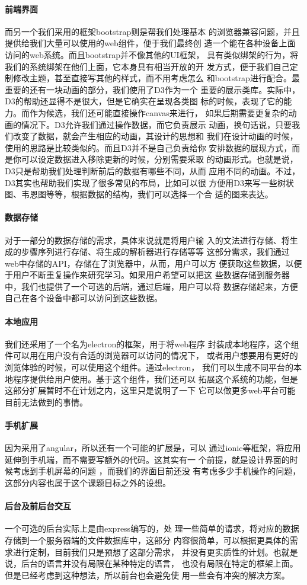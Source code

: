 \paragraph{前端界面} 而另一个我们采用的框架bootstrap则是帮我们处理基本
的浏览器兼容问题，并且提供给我们大量可以使用的web组件，便于我们最终创
造一个能在各种设备上面访问的web系统。而且bootstrap并不像其他的UI框架，
具有类似绑架的行为，将我们的系统绑架在他们上面，它本身具有相当开放的开
发方式，便于我们自己定制修改主题，甚至直接写其他的样式，而不用考虑怎么
和bootstrap进行配合。最重要的还有一块动画的部分，我们使用了D3作为一个
重要的展示类库。实际中，D3的帮助还显得不是很大，但是它确实在呈现各类图
标的时候，表现了它的能力。而作为候选，我们还可能直接操作canvas来进行，
如果后期需要更复杂的动画的情况下。D3允许我们通过操作数据，而它负责展示
动画，换句话说，只要我们改变了数据，就会产生相应的动画，其设计的思想和
我们在设计动画的时候，使用的思路是比较类似的。而且D3并不是自己负责给你
安排数据的展现方式，而是你可以设定数据进入移除更新的时候，分别需要采取
的动画形式。也就是说，D3只是帮助我们处理判断前后的数据有哪些不同，从而
应用不同的动画。不过，D3其实也帮助我们实现了很多常见的布局，比如可以很
方便用D3来写一些树状图、韦恩图等等，根据数据的结构，我们可以选择一个合
适的图来表达。
\paragraph{数据存储} 对于一部分的数据存储的需求，具体来说就是将用户输
入的文法进行存储、将生成的步骤序列进行存储、将生成的解析器进行存储等等
这部分需求，我们通过web中存储的API，存储在了浏览器中，从而，用户可以方
便获取这些数据，以便于用户不断重复操作来研究学习。如果用户希望可以把这
些数据存储到服务器中，我们也提供了一个可选的后端，通过后端，用户可以将
数据存储起来，方便自己在各个设备中都可以访问到这些数据。
\paragraph{本地应用}我们还采用了一个名为electron的框架，用于将web程序
封装成本地程序，这个组件可以用在用户没有合适的浏览器可以访问的情况下，
或者用户想要用有更好的浏览体验的时候，可以使用这个组件。通过electron，
我们可以生成不同平台的本地程序提供给用户使用。基于这个组件，我们还可以
拓展这个系统的功能，但是这部分扩展暂时不在计划之内，这里只是说明了一下
它可以做更多web平台可能目前无法做到的事情。
\paragraph{手机扩展}因为采用了angular，所以还有一个可能的扩展是，可以
通过ionic等框架，将应用延伸到手机端，而不需要写额外的代码。这其实有一
个前提，就是设计界面的时候考虑到手机屏幕的问题 ，而我们的界面目前还没
有考虑多少手机操作的问题，这部分内容也属于这个课题目标之外的设想。
\paragraph{后台及前后台交互} 一个可选的后台实际上是由express编写的，处
理一些简单的请求，将对应的数据存储到一个服务器端的文件数据库中，这部分
内容很简单，可以根据更具体的需求进行定制，目前我们只是预想了这部分需求，
并没有更实质性的计划。也就是说，后台的语言并没有局限在某种特定的语言，
也没有局限在特定的框架上面。但是已经考虑到这种想法，所以前台也会避免使
用一些会有冲突的解决方案。
